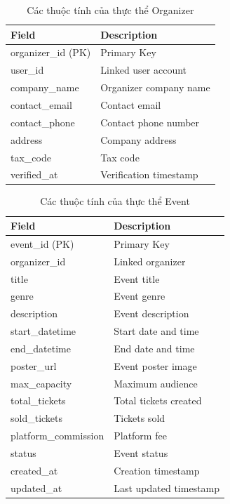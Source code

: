 \begin{table}[H]
\centering
\begin{tabular}{|p{4.5cm}|p{6cm}|}
\hline
\textbf{Field} & \textbf{Description} \\ \hline
organizer\_id (PK) & Primary Key \\ \hline
user\_id & Linked user account \\ \hline
company\_name & Organizer company name \\ \hline
contact\_email & Contact email \\ \hline
contact\_phone & Contact phone number \\ \hline
address & Company address \\ \hline
tax\_code & Tax code \\ \hline
verified\_at & Verification timestamp \\ \hline
\end{tabular}
\vspace{15pt}
\caption{Các thuộc tính của thực thể Organizer}
\end{table}

\begin{table}[H]
\centering
\begin{tabular}{|p{4.5cm}|p{6cm}|}
\hline
\textbf{Field} & \textbf{Description} \\ \hline
event\_id (PK) & Primary Key \\ \hline
organizer\_id & Linked organizer \\ \hline
title & Event title \\ \hline
genre & Event genre \\ \hline
description & Event description \\ \hline
start\_datetime & Start date and time \\ \hline
end\_datetime & End date and time \\ \hline
poster\_url & Event poster image \\ \hline
max\_capacity & Maximum audience \\ \hline
total\_tickets & Total tickets created \\ \hline
sold\_tickets & Tickets sold \\ \hline
platform\_commission & Platform fee \\ \hline
status & Event status \\ \hline
created\_at & Creation timestamp \\ \hline
updated\_at & Last updated timestamp \\ \hline
\end{tabular}
\vspace{15pt}
\caption{Các thuộc tính của thực thể Event}
\end{table}

